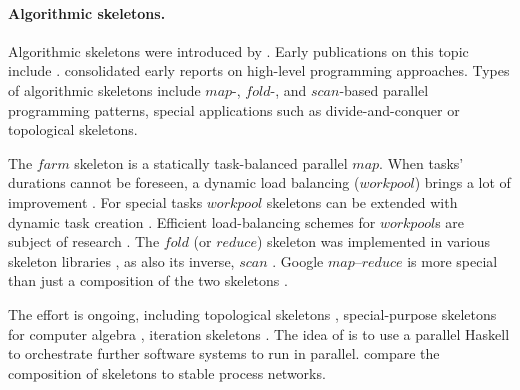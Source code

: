 \documentclass{jfp1}
\newcommand{\Varid}[1]{\mathit{#1}}
\renewcommand{\cite}[1]{\citep{#1}}
\begin{document}
\paragraph{Algorithmic skeletons.}
Algorithmic skeletons were introduced by \citet{Cole1989}.
Early publications on this topic include \cite{DANELUTTO1992205,darlington1993parallel,botorog1996efficient,Lengauer1997,Gorlatch1998}. \citet{SkeletonBook} consolidated early reports on high-level programming approaches.
Types of algorithmic skeletons include \ensuremath{\Varid{map}}-, \ensuremath{\Varid{fold}}-, and \ensuremath{\Varid{scan}}-based parallel programming patterns, special applications such as divide-and-conquer or topological skeletons.

The \ensuremath{\Varid{farm}} skeleton \citep{Hey1990185,Eden:PPDP01,Kuchen05} is a statically task-balanced parallel \ensuremath{\Varid{map}}. When tasks' durations cannot be foreseen, a dynamic load balancing (\ensuremath{\Varid{workpool}}) brings a lot of improvement \citep{Rudolph:1991:SLB:113379.113401,doi:10.1142/S0129626403001380,Hippold2006,PADL08HMWS,Marlow2009}. For special tasks \ensuremath{\Varid{workpool}} skeletons can be extended with dynamic task creation \cite{WPEuropar06,Dinan:2009:SWS:1654059.1654113,brown2010ever}. Efficient load-balancing schemes for \ensuremath{\Varid{workpool}}s are subject of research \cite{Blumofe:1999:SMC:324133.324234,Acar:2000:DLW:341800.341801,vanNieuwpoort:2001:ELB:568014.379563,Chase:2005:DCW:1073970.1073974,4625841,Michael:2009:IWS:1594835.1504186}.
%
The \ensuremath{\Varid{fold}} (or \ensuremath{\Varid{reduce}}) skeleton was implemented in various skeleton libraries \cite{Kuchen2002,5361825,BUONO20102095,Dastgeer:2011:ASM:1984693.1984697}, as also its inverse, \ensuremath{\Varid{scan}} \cite{Bischof2002,harris2007parallel}.
%
Google \ensuremath{\Varid{map}}--\ensuremath{\Varid{reduce}} \cite{Dean:2008:MSD:1327452.1327492,Dean:2010:MFD:1629175.1629198} is more special than just a composition of the two skeletons \cite{LAMMEL20081,Berthold2009-mr}.

The effort is ongoing, including topological skeletons \cite{Eden:PARCO05}, special-purpose skeletons for computer algebra \cite{Berthold2009-fft,lobachev-phd,Lobachev2012,janjic2013space}, iteration skeletons \cite{Dieterle2013}. The idea of \citet{scscp} is to use a parallel Haskell to orchestrate further software systems to run in parallel. \citet{dieterle_horstmeyer_loogen_berthold_2016} compare the composition of skeletons to stable process networks.
\end{document}
